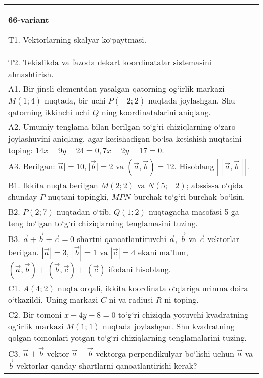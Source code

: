 \documentclass{article}
\begin{document}
\begin{tabular}{m{17cm}}
\textbf{66-variant}
\newline

T1. 
Vektorlarning skalyar ko‘paytmasi.
 \\
T2. Tekislikda va fazoda dekart koordinatalar sistemasini almashtirish.
 \\
A1. 
Bir jinsli elementdan yasalgan qatorning og‘irlik markazi
$M (1;4) $ nuqtada, bir uchi $P (-2;2) $ nuqtada joylashgan. Shu
qatorning ikkinchi uchi $Q$ ning koordinatalarini aniqlang.
 \\
A2. 
Umumiy tenglama bilan berilgan to‘g‘ri chiziqlarning
o‘zaro joylashuvini aniqlang, agar kesishadigan bo‘lsa kesishish nuqtasini
toping: $14x-9y-24=0, 7x-2y-17=0$.
 \\
A3. 
Berilgan: $\overrightarrow{a}| = 10,|\overrightarrow{b}| = 2$ va
$\left(\overrightarrow{a},\overrightarrow{b} \right) = 12$. Hisoblang
$\left| \left\lbrack \overrightarrow{a},\overrightarrow{b} \right\rbrack \right|$.
 \\
B1. 
Ikkita nuqta berilgan \(M (2;2) \) va \(N (5;-2) \); abssissa o‘qida shunday $P$ nuqtani topingki, $MPN$ burchak to‘g‘ri burchak bo‘lsin.
 \\
B2. 
\(P (2;7) \) nuqtadan o‘tib, \(Q (1;2) \) nuqtagacha
masofasi 5 ga teng bo‘lgan to‘g‘ri chiziqlarning tenglamasini tuzing.
 \\
B3. 
$\vec{a} + \vec{b} + \vec{c} = 0$ shartni qanoatlantiruvchi $\vec{a},\ \vec{b}$ va $\vec{c}$ vektorlar berilgan. $|\vec{a}| = 3,\ |\vec{b}| = 1$ va $|\vec{c}| = 4$ ekani ma’lum, $\left(\vec{a},\vec{b} \right) + \left(\vec{b},\vec{c} \right) + (\vec{c}) $ ifodani hisoblang.
 \\
C1. \(A (4;2) \) nuqta orqali, ikkita koordinata o‘qlariga
urinma doira o‘tkazildi. Uning markazi $C$ ni va radiusi
$R$ ni toping.
 \\
C2. 
Bir tomoni \(x-4y - 8 = 0\) to‘g‘ri chiziqda yotuvchi
kvadratning og‘irlik markazi \(M (1;1) \) nuqtada joylashgan. Shu kvadratning
qolgan tomonlari yotgan to‘g‘ri chiziqlarning tenglamalarini tuzing.
 \\
C3. 
\(\vec{a} + \vec{b}\) vektor \(\vec{a} - \vec{b}\) vektorga perpendikulyar bo‘lishi uchun \(\vec{a}\) va \(\vec{b}\) vektorlar qanday shartlarni qanoatlantirishi kerak?
 \\

\end{tabular}
\vspace{1cm}
\end{document}
